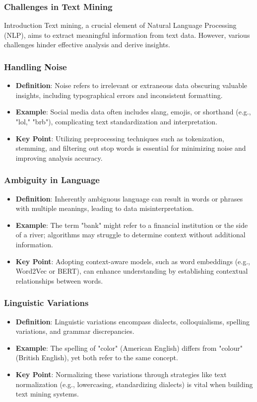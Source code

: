 \documentclass[aspectratio=169]{beamer}
\begin{document}
\begin{frame}[fragile]
    \frametitle{Challenges in Text Mining}
    \begin{block}{Introduction}
        Text mining, a crucial element of Natural Language Processing (NLP), aims to extract meaningful information from text data. However, various challenges hinder effective analysis and derive insights.
    \end{block}
\end{frame}

\begin{frame}[fragile]
    \frametitle{Handling Noise}
    \begin{itemize}
        \item \textbf{Definition}: Noise refers to irrelevant or extraneous data obscuring valuable insights, including typographical errors and inconsistent formatting.
        \item \textbf{Example}: Social media data often includes slang, emojis, or shorthand (e.g., "lol," "brb"), complicating text standardization and interpretation.
        \item \textbf{Key Point}: Utilizing preprocessing techniques such as tokenization, stemming, and filtering out stop words is essential for minimizing noise and improving analysis accuracy.
    \end{itemize}
\end{frame}

\begin{frame}[fragile]
    \frametitle{Ambiguity in Language}
    \begin{itemize}
        \item \textbf{Definition}: Inherently ambiguous language can result in words or phrases with multiple meanings, leading to data misinterpretation.
        \item \textbf{Example}: The term "bank" might refer to a financial institution or the side of a river; algorithms may struggle to determine context without additional information.
        \item \textbf{Key Point}: Adopting context-aware models, such as word embeddings (e.g., Word2Vec or BERT), can enhance understanding by establishing contextual relationships between words.
    \end{itemize}
\end{frame}

\begin{frame}[fragile]
    \frametitle{Linguistic Variations}
    \begin{itemize}
        \item \textbf{Definition}: Linguistic variations encompass dialects, colloquialisms, spelling variations, and grammar discrepancies.
        \item \textbf{Example}: The spelling of "color" (American English) differs from "colour" (British English), yet both refer to the same concept.
        \item \textbf{Key Point}: Normalizing these variations through strategies like text normalization (e.g., lowercasing, standardizing dialects) is vital when building text mining systems.
    \end{itemize}
\end{frame}
\end{document}
